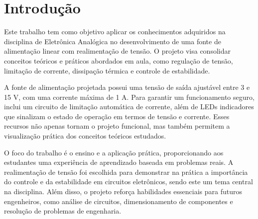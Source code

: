 \section{Introdução}

Este trabalho tem como objetivo aplicar os conhecimentos adquiridos na disciplina de Eletrônica Analógica no desenvolvimento de uma fonte de alimentação linear com realimentação de tensão. O projeto visa consolidar conceitos teóricos e práticos abordados em aula, como regulação de tensão, limitação de corrente, dissipação térmica e controle de estabilidade.

A fonte de alimentação projetada possui uma tensão de saída ajustável entre 3 e 15 V, com uma corrente máxima de 1 A. Para garantir um funcionamento seguro, inclui um circuito de limitação automática de corrente, além de LEDs indicadores que sinalizam o estado de operação em termos de tensão e corrente. Esses recursos não apenas tornam o projeto funcional, mas também permitem a visualização prática dos conceitos teóricos estudados.

O foco do trabalho é o ensino e a aplicação prática, proporcionando aos estudantes uma experiência de aprendizado baseada em problemas reais. A realimentação de tensão foi escolhida para demonstrar na prática a importância do controle e da estabilidade em circuitos eletrônicos, sendo este um tema central na disciplina. Além disso, o projeto reforça habilidades essenciais para futuros engenheiros, como análise de circuitos, dimensionamento de componentes e resolução de problemas de engenharia.

\nocite{boylestad, malvino}
